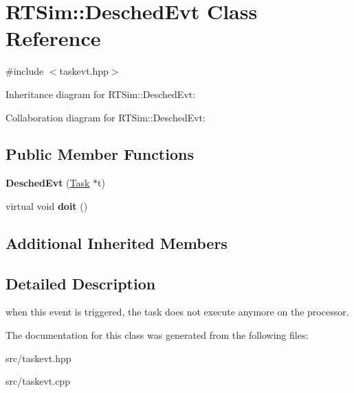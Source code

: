 \hypertarget{classRTSim_1_1DeschedEvt}{}\section{R\+T\+Sim\+:\+:Desched\+Evt Class Reference}
\label{classRTSim_1_1DeschedEvt}


{\ttfamily \#include $<$taskevt.\+hpp$>$}



Inheritance diagram for R\+T\+Sim\+:\+:Desched\+Evt\+:


Collaboration diagram for R\+T\+Sim\+:\+:Desched\+Evt\+:
\subsection*{Public Member Functions}
\begin{DoxyCompactItemize}
\item 
{\bfseries Desched\+Evt} (\hyperlink{classRTSim_1_1Task}{Task} $\ast$t)
\item 
virtual void {\bfseries doit} ()
\end{DoxyCompactItemize}
\subsection*{Additional Inherited Members}


\subsection{Detailed Description}
when this event is triggered, the task does not execute anymore on the processor. 

The documentation for this class was generated from the following files\+:\begin{DoxyCompactItemize}
\item 
src/taskevt.\+hpp\item 
src/taskevt.\+cpp\end{DoxyCompactItemize}
